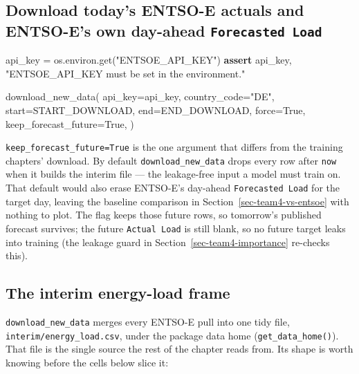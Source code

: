 \documentclass[
  english,
  letterpaper,
]{scrbook}
\newenvironment{Shaded}{\begin{snugshade}}{\end{snugshade}}
\newcommand{\ControlFlowTok}[1]{\textcolor[rgb]{0.00,0.23,0.31}{\textbf{#1}}}
\newcommand{\NormalTok}[1]{\textcolor[rgb]{0.00,0.23,0.31}{#1}}
\newcommand{\OperatorTok}[1]{\textcolor[rgb]{0.37,0.37,0.37}{#1}}
\newcommand{\StringTok}[1]{\textcolor[rgb]{0.13,0.47,0.30}{#1}}
\newcommand{\VariableTok}[1]{\textcolor[rgb]{0.07,0.07,0.07}{#1}}
\begin{document}
\subsection{\texorpdfstring{Download today's ENTSO-E actuals and
ENTSO-E's own day-ahead
\texttt{Forecasted\ Load}}{Download today's ENTSO-E actuals and ENTSO-E's own day-ahead Forecasted Load}}\label{sec-team4-download}

\protect{}\label{team4-download}
\begin{Shaded}
\begin{Highlighting}[]
\NormalTok{api\_key }\OperatorTok{=}\NormalTok{ os.environ.get(}\StringTok{"ENTSOE\_API\_KEY"}\NormalTok{)}
\ControlFlowTok{assert}\NormalTok{ api\_key, }\StringTok{"ENTSOE\_API\_KEY must be set in the environment."}

\NormalTok{download\_new\_data(}
\NormalTok{    api\_key}\OperatorTok{=}\NormalTok{api\_key,}
\NormalTok{    country\_code}\OperatorTok{=}\StringTok{"DE"}\NormalTok{,}
\NormalTok{    start}\OperatorTok{=}\NormalTok{START\_DOWNLOAD,}
\NormalTok{    end}\OperatorTok{=}\NormalTok{END\_DOWNLOAD,}
\NormalTok{    force}\OperatorTok{=}\VariableTok{True}\NormalTok{,}
\NormalTok{    keep\_forecast\_future}\OperatorTok{=}\VariableTok{True}\NormalTok{,}
\NormalTok{)}
\end{Highlighting}
\end{Shaded}

\texttt{keep\_forecast\_future=True} is the one argument that differs
from the training chapters' download. By default
\texttt{download\_new\_data} drops every row after \texttt{now} when it
builds the interim file --- the leakage-free input a model must train
on. That default would also erase ENTSO-E's day-ahead
\texttt{Forecasted\ Load} for the target day, leaving the baseline
comparison in Section~\ref{sec-team4-vs-entsoe} with nothing to plot.
The flag keeps those future rows, so tomorrow's published forecast
survives; the future \texttt{Actual\ Load} is still blank, so no future
target leaks into training (the leakage guard in
Section~\ref{sec-team4-importance} re-checks this).

\subsection{The interim energy-load frame}\label{sec-team4-interim}

\texttt{download\_new\_data} merges every ENTSO-E pull into one tidy
file, \texttt{interim/energy\_load.csv}, under the package data home
(\texttt{get\_data\_home()}). That file is the single source the rest of
the chapter reads from. Its shape is worth knowing before the cells
below slice it:
\end{document}
